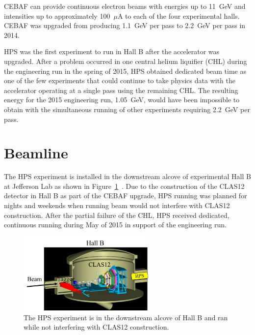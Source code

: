 CEBAF can provide continuous electron beams with energies up to 11~GeV and intensities up to approximately 100~$\mu$A to each of the four experimental halls. CEBAF was upgraded from producing 1.1~GeV per pass to 2.2~GeV per pass in 2014. 

HPS was the first experiment to run in Hall B after the accelerator was upgraded. After a problem occurred in one central helium liquifier (CHL) during the engineering run in the spring of 2015, HPS obtained dedicated beam time as one of the few experiments that could continue to take physics data with the accelerator operating at a single pass using the remaining CHL. The resulting energy for the 2015 engineering run, 1.05~GeV, would have been impossible to obtain with the simultaneous running of other experiments requiring 2.2~GeV per pass.  

\section{Beamline}
The HPS experiment is installed in the downstream alcove of experimental Hall B at Jefferson Lab as shown in Figure~\ref{Figure:hallB}~\cite{beamline_nim_2017}. Due to the construction of the CLAS12 detector in Hall B as part of the CEBAF upgrade, HPS running was planned for nights and weekends when running beam would not interfere with CLAS12 construction. After the partial failure of the CHL, HPS received dedicated, continuous running during May of 2015 in support of the engineering run. 

\begin{figure}[htb]
  \centering
      \includegraphics[width=0.6\textwidth]{pics/experiment/hallB.png}
  \caption[HPS location in Hall B]{The HPS experiment is in the downstream alcove of Hall B and ran while not interfering with CLAS12 construction.}
  \label{Figure:hallB}
\end{figure}

